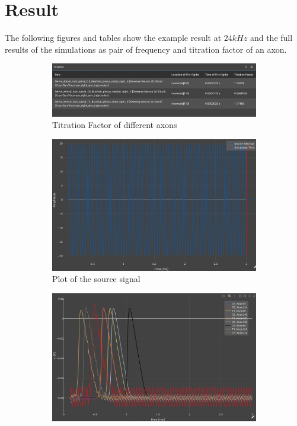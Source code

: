 \documentclass[letterpaper,12pt]{article}
\begin{document}
\section*{Result}
\noindent The following figures and tables show the example result at $24kHz$ and the full results of the simulations as pair of frequency and titration factor of an axon.
\begin{figure}[H]
    \centering
    \begin{subfigure}[b]{0.45\textwidth}
        \centering
        \includegraphics[scale=0.11]{titration_factor.png}
        \caption{Titration Factor of different axons} 
        \label{fig:titration}
    \end{subfigure}
    \vfill
    \begin{subfigure}[b]{0.45\textwidth}
        \centering
        \includegraphics[scale=0.10]{source_signal.png}
        \caption{Plot of the source signal}
        \label{fig:source_signal}
    \end{subfigure}
    \hfill
    \begin{subfigure}[b]{0.45\textwidth}
        \centering
        \includegraphics[scale=0.10]{action_potential_registered.png}

\end{subfigure}
\end{figure}
\end{document}
